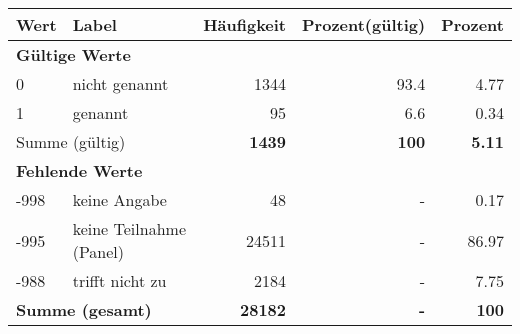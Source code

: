      \begin{longtable}{lXrrr}
     \toprule
     \textbf{Wert} & \textbf{Label} & \textbf{Häufigkeit} & \textbf{Prozent(gültig)} & \textbf{Prozent} \\
     \endhead
     \midrule
     \multicolumn{5}{l}{\textbf{Gültige Werte}}\\

     0 &
     \multicolumn{1}{X}{ nicht genannt   } &


       \num{1344} &
       \num[round-mode=places,round-precision=2]{93,4} &
         \num[round-mode=places,round-precision=2]{4,77} \\

     1 &
     \multicolumn{1}{X}{ genannt   } &


       \num{95} &
       \num[round-mode=places,round-precision=2]{6,6} &
         \num[round-mode=places,round-precision=2]{0,34} \\
     \midrule
     \multicolumn{2}{l}{Summe (gültig)} &
       \textbf{\num{1439}} &
     \textbf{100} &
       \textbf{\num[round-mode=places,round-precision=2]{5,11}} \\
     \multicolumn{5}{l}{\textbf{Fehlende Werte}}\\
       -998 &
       keine Angabe &
         \num{48} &
        - &
         \num[round-mode=places,round-precision=2]{0,17} \\
       -995 &
       keine Teilnahme (Panel) &
         \num{24511} &
        - &
         \num[round-mode=places,round-precision=2]{86,97} \\
       -988 &
       trifft nicht zu &
         \num{2184} &
        - &
         \num[round-mode=places,round-precision=2]{7,75} \\
     \midrule
     \multicolumn{2}{l}{\textbf{Summe (gesamt)}} &
          \textbf{\num{28182}} &
        \textbf{-} &
        \textbf{100} \\
     \bottomrule
     \end{longtable}
     
